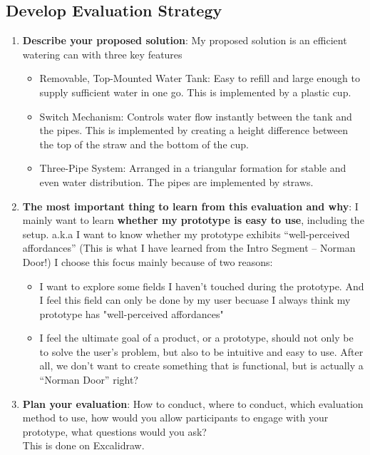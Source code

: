 \documentclass[math,code]{amznotes}
\theoremstyle{remark}
\begin{document}
\subsection{Develop Evaluation Strategy}
\begin{enumerate}
    \item \textbf{Describe your proposed solution}: My proposed solution is an efficient watering can with three key features
    \begin{itemize}
        \item Removable, Top-Mounted Water Tank: Easy to refill and large enough to supply sufficient water in one go. This is implemented by a plastic cup.
        \item Switch Mechanism: Controls water flow instantly between the tank and the pipes. This is implemented by creating a height difference between the top of the straw and the bottom of the cup.
        \item Three-Pipe System: Arranged in a triangular formation for stable and even water distribution. The pipes are implemented by straws.
    \end{itemize}
    \item \textbf{The most important thing to learn from this evaluation and why}: I mainly want to learn \textbf{whether my prototype is easy to use}, including the setup. a.k.a I want to know whether my prototype exhibits ``well-perceived affordances'' (This is what I have learned from the Intro Segment -- Norman Door!) I choose this focus mainly because of two reasons:
    \begin{itemize}
        \item I want to explore some fields I haven't touched during the prototype. And I feel this field can only be done by my user becuase I always think my prototype has "well-perceived affordances"
        \item I feel the ultimate goal of a product, or a prototype, should not only be to solve the user's problem, but also to be intuitive and easy to use. After all, we don't want to create something that is functional, but is actually a ``Norman Door'' right?
    \end{itemize}
    \item \textbf{Plan your evaluation}: How to conduct, where to conduct, which evaluation method to use, how would you allow participants to engage with your prototype, what questions would you ask? \\
    This is done on Excalidraw.
\end{enumerate}
\end{document}
